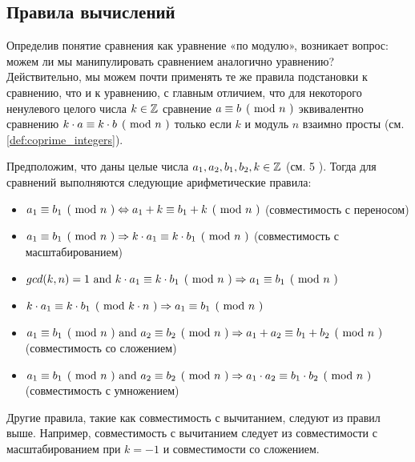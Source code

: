 \subsection{Правила вычислений} Определив понятие сравнения как уравнение «по модулю», возникает вопрос: можем ли мы манипулировать сравнением аналогично уравнению? Действительно, мы можем почти применять те же правила подстановки к сравнению, что и к уравнению, с главным отличием, что для некоторого ненулевого целого числа $k\in \mathbb{Z}$ сравнение $\kongru{a}{b}{n}$ эквивалентно сравнению $\kongru{k\cdot a}{k\cdot b}{n}$ только если $k$ и модуль $n$ взаимно просты (см. \ref{def:coprime_integers}). 

Предположим, что даны целые числа $a_1,a_2,b_1,b_2, k\in\mathbb{Z}$ (см. \chaptname{} 5 \cite{hardy-2008}). Тогда для сравнений выполняются следующие арифметические правила:
\begin{itemize}
\label{def:modular_arithmetic_rules}
\item $\kongru{a_1}{b_1}{n}\Leftrightarrow \kongru{a_1+k}{b_1+k}{n}$ (совместимость с переносом)
\item $\kongru{a_1}{b_1}{n}\Rightarrow\kongru{k\cdot a_1}{k\cdot b_1}{n}$ (совместимость с масштабированием)
\item $gcd(k,n)=1 \text{ and } \kongru{k\cdot a_1}{k\cdot b_1}{n}\Rightarrow \kongru{a_1}{b_1}{n}$
\item $\kongru{k\cdot a_1}{k\cdot b_1}{k\cdot n}\Rightarrow\kongru{a_1}{b_1}{n}$
\item $\kongru{a_1}{b_1}{n}\text{ and } \kongru{a_2}{b_2}{n}\Rightarrow \kongru{a_1+a_2}{b_1+b_2}{n}$ (совместимость со сложением)
\item $\kongru{a_1}{b_1}{n}\text{ and } \kongru{a_2}{b_2}{n}\Rightarrow\kongru{a_1\cdot a_2}{b_1\cdot b_2}{n}$ (совместимость с умножением)
\end{itemize}
Другие правила, такие как совместимость с вычитанием, следуют из правил выше. Например, совместимость с вычитанием следует из совместимости с масштабированием при $k=-1$ и совместимости со сложением.

